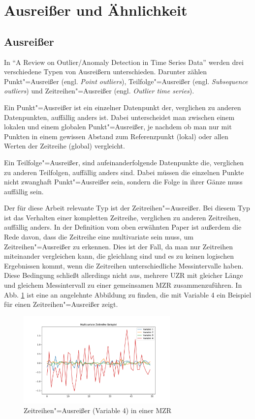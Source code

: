 \section{Ausreißer und Ähnlichkeit}
\subsection{Ausreißer}
In "`A Review on Outlier/Anomaly Detection in Time Series Data"' \cite[Ch. 2.2]{reviewOutlierDetection} werden drei verschiedene Typen von Ausreißern unterschieden. Darunter zählen Punkt"=Ausreißer (engl. \textit{Point outliers}), Teilfolge"=Ausreißer (engl. \textit{Subsequence outliers}) und Zeitreihen"=Ausreißer (engl. \textit{Outlier time series}).

Ein Punkt"=Ausreißer ist ein einzelner Datenpunkt der, verglichen zu anderen Datenpunkten, auffällig anders ist. Dabei unterscheidet man zwischen einem lokalen und einem globalen Punkt"=Ausreißer, je nachdem ob man nur mit Punkten in einem gewissen Abstand zum Referenzpunkt (lokal) oder allen Werten der Zeitreihe (global) vergleicht.

Ein Teilfolge"=Ausreißer, sind aufeinanderfolgende Datenpunkte die, verglichen zu anderen Teilfolgen, auffällig anders sind. Dabei müssen die einzelnen Punkte nicht zwanghaft Punkt"=Ausreißer sein, sondern die Folge in ihrer Gänze muss auffällig sein. 

Der für diese Arbeit relevante Typ ist der Zeitreihen"=Ausreißer. Bei diesem Typ ist das Verhalten einer kompletten Zeitreihe, verglichen zu anderen Zeitreihen, auffällig anders. In der Definition vom oben erwähnten Paper \cite{reviewOutlierDetection} ist außerdem die Rede davon, dass die Zeitreihe eine multivariate sein muss, um Zeitreihen"=Ausreißer zu erkennen. Dies ist der Fall, da man nur Zeitreihen miteinander vergleichen kann, die gleichlang sind und es zu keinen logischen Ergebnissen kommt, wenn die Zeitreihen unterschiedliche Messintervalle haben. Diese Bedingung schließt allerdings nicht aus, mehrere \acs{UZR} mit gleicher Länge und gleichem Messintervall zu einer gemeinsamen \acs{MZR} zusammenzuführen. In Abb. \ref{fig:ZeitreihenAusreisserBeispiel} ist eine an \cite[Fig. 5]{reviewOutlierDetection} angelehnte Abbildung zu finden, die mit Variable 4 ein Beispiel für einen Zeitreihen"=Ausreißer zeigt.
\begin{figure}[bth] 
  \centering
  \includegraphics[width=0.7\textwidth]{Graphics/TimeSeriesOutlierExample.pdf}
  \caption{Zeitreihen"=Ausreißer (Variable 4) in einer \acs{MZR}}
  \label{fig:ZeitreihenAusreisserBeispiel}
\end{figure}

